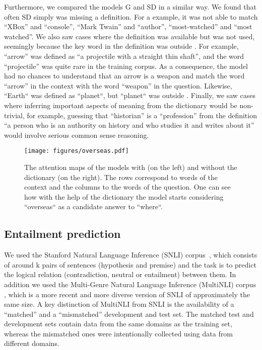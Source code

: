 Furthermore, we compared the models G and SD in a similar way. We found that often
SD simply was missing a definition. For a example, it was not able to match ``XBox'' and ``console'', ``Mark Twain'' and ``author'', ``most-watched'' and ``most watched''. We also saw cases where the definition was available but was not used, seemingly because the key word in the definition was outside . For example, ``arrow'' was defined as ``a projectile with a straight thin shaft'', and the word ``projectile'' was quite rare in the training corpus. As a consequence, the model had no chances to understand that an arrow is a weapon and match the word ``arrow'' in the context with the word ``weapon'' in the question. Likewise, ``Earth`` was defined as ``planet``, but ``planet`` was outside . Finally, we saw cases where inferring important aspects of meaning from the dictionary would be non-trivial, for example, guessing that ``historian'' is a ``profession'' from the definition ``a person who is an authority on history and who studies it and writes about it'' would involve serious common sense reasoning.

\begin{figure}
\centering
\texttt{[image: figures/overseas.pdf]}
\caption{\label{fig:SQUAD_autumn_season}The attention maps  of the models with (on the left) and without the dictionary (on the right). The rows correspond to words of the context and the columns to the words of the question. One can see how with the help of the dictionary the model starts considering ``overseas`` as a candidate answer to ``where``.}
\end{figure}


\subsection{Entailment prediction}

We used the Stanford Natural Language Inference (SNLI) corpus~\citep{bowman2015large}, which consists of around k pairs of sentences (hypothesis and premise) and the task is to predict the logical relation (contradiction, neutral or entailment) between them. In addition we used the Multi-Genre Natural Language Inference (MultiNLI) corpus \citep{williams2017broad}, 
which  is a more recent and more diverse version of SNLI of approximately the same size. A key distinction of MultiNLI from SNLI is the availability of a ``matched'' and a ``mismatched'' development and test set. The matched test and development sets contain data from the same domains as the training set, whereas the mismatched ones were intentionally collected using data from different domains.

